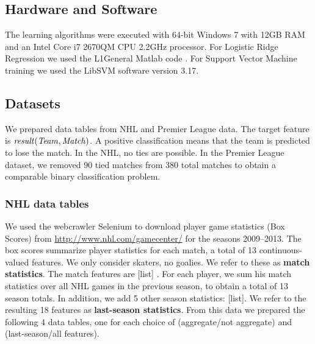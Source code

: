 \documentclass[oribibl]{llncs}%
\begin{document}
\subsection{Hardware and Software} The learning algorithms were executed with 64-bit Windows 7 with 12GB RAM and an Intel Core i7 2670QM CPU 2.2GHz processor. For Logistic Ridge Regression we used the L1General Matlab code \cite{bib:l1general}. For Support Vector Machine training we used the LibSVM software version 3.17.


\subsection{Datasets}

We prepared data tables from NHL and Premier League data. The target feature is $\it{result(Team,Match)}$. A positive classification means that the team is predicted to lose the match. In the NHL, no ties are possible. In the Premier League dataset, we removed 90 tied matches from 380 total matches to obtain a comparable binary classification problem.

\subsubsection{NHL data tables}

We used the webcrawler Selenium \cite{bib:crawler} to download player game statistics (Box Scores) from \url{http://www.nhl.com/gamecenter/} for the seasons 2009--2013. The box scores summarize player statistics for each match, a total of 13 continuous-valued features. We only consider skaters, no goalies. We refer to these as \textbf{match statistics}. The match features are [list]  . For each player, we sum his match statistics over all NHL games in the previous season, to obtain a total of 13 season totals. In addition, we add 5 other season statistics: [list]. We refer to the resulting 18 features as \textbf{last-season statistics}. From this data we prepared the following 4 data tables, one for each choice of (aggregate/not aggregate) and (last-season/all features).
\end{document}
